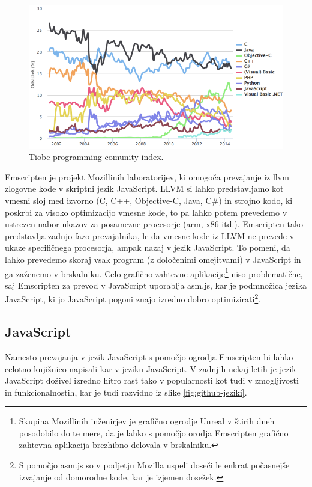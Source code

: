 \begin{figure}
 \includegraphics[width=\linewidth]{tiobe-index}
 \caption{Tiobe programming comunity index\cite{tiobe}.}
 \label{fig:tiobe-index}
\end{figure}

Emscripten je projekt Mozillinih laboratorijev, ki omogoča prevajanje iz \gls{llvm} zlogovne kode v skriptni jezik JavaScript. LLVM si lahko predstavljamo kot vmesni sloj med izvorno (C, C++, Objective-C, Java, C\#) in strojno kodo, ki poskrbi za visoko optimizacijo vmesne kode, to pa lahko potem prevedemo v ustrezen nabor ukazov za posamezne procesorje (\gls{arm}, x86 itd.). Emscripten tako predstavlja zadnjo fazo prevajalnika, le da vmesne kode iz LLVM ne prevede v ukaze specifičnega procesorja, ampak nazaj v jezik JavaScript. To pomeni, da lahko prevedemo skoraj vsak program (z določenimi omejitvami) v JavaScript in ga zaženemo v brskalniku. Celo grafično zahtevne aplikacije\footnote{Skupina Mozillinih inženirjev je grafično ogrodje Unreal v štirih dneh posodobilo do te mere, da je lahko s pomočjo orodja Emscripten grafično zahtevna aplikacija brezhibno delovala v brskalniku\cite{epic-citadel}.} niso problematične, saj Emscripten za prevod v JavaScript uporablja asm.js\cite{asmjs}, kar je podmnožica jezika JavaScript, ki jo JavaScript pogoni znajo izredno dobro optimizirati\footnote{S pomočjo asm.js so v podjetju Mozilla uspeli doseči le enkrat počasnejše izvajanje od domorodne kode, kar je izjemen dosežek.\cite{mozilla-asmjs}}.

\subsection{JavaScript}
\label{chap:javascript}

Namesto prevajanja v jezik JavaScript s pomočjo ogrodja Emscripten bi lahko celotno knjižnico napisali kar v jeziku JavaScript. V zadnjih nekaj letih je jezik JavaScript doživel izredno hitro rast tako v popularnosti kot tudi v zmogljivosti in funkcionalnostih, kar je tudi razvidno iz slike \ref{fig:github-jeziki}.

